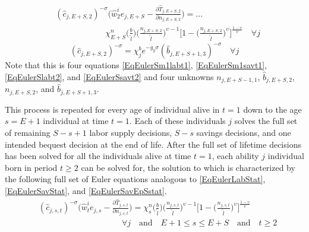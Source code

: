\documentclass[letterpaper,12pt]{article}
\theoremstyle{definition}
\begin{document}
  \begin{equation}\label{EqEulerSlabt2}
    \begin{split}
      &(\hat{c}_{j,E+S,2})^{-\sigma}\Biggl(\hat{w}_2^i e_{j,E+S} - \frac{\partial\hat{T}_{j,E+S,2}}{\partial n_{j,E+S,2}}\Biggr) = ... \\
      &\qquad\qquad\qquad \chi^n_{E+S}\biggl(\frac{b}{\tilde{l}}\biggr)\biggl(\frac{n_{j,E+S,2}}{\tilde{l}}\biggr)^{\upsilon-1}\Biggl[1 - \biggl(\frac{n_{j,E+S,2}}{\tilde{l}}\biggr)^\upsilon\Biggr]^{\frac{1-\upsilon}{\upsilon}} \quad\forall j
    \end{split}
  \end{equation}
  \begin{equation}\label{EqEulerSsavt2}
    (\hat{c}_{j,E+S,2})^{-\sigma} = \chi^b_j e^{-g_y\sigma}(\hat{b}_{j,E+S+1,3})^{-\sigma} \quad\forall j
  \end{equation}
  Note that this is four equations \eqref{EqEulerSm1labt1}, \eqref{EqEulerSm1savt1}, \eqref{EqEulerSlabt2}, and \eqref{EqEulerSsavt2} and four unknowns $n_{j,E+S-1,1}$, $\hat{b}_{j,E+S,2}$, $n_{j,E+S,2}$, and $\hat{b}_{j,E+S+1,3}$.

  This process is repeated for every age of individual alive in $t=1$ down to the age $s=E+1$ individual at time $t=1$. Each of these individuals $j$ solves the full set of remaining $S-s+1$ labor supply decisions, $S-s$ savings decisions, and one intended bequest decision at the end of life. After the full set of lifetime decisions has been solved for all the individuals alive at time $t=1$, each ability $j$ individual born in period $t\geq 2$ can be solved for, the solution to which is characterized by the following full set of Euler equations analogous to \eqref{EqEulerLabStat}, \eqref{EqEulerSavStat}, and \eqref{EqEulerSavEpSstat}.
  \begin{equation}\label{EqEulerslabt}
    \begin{split}
      &(\hat{c}_{j,s,t})^{-\sigma}\Biggl(\hat{w}_t^i e_{j,s} - \frac{\partial\hat{T}_{j,s,t}}{\partial n_{j,s,t}}\Biggr) =  \chi^n_{s}\biggl(\frac{b}{\tilde{l}}\biggr)\biggl(\frac{n_{j,s,t}}{\tilde{l}}\biggr)^{\upsilon-1}\Biggl[1 - \biggl(\frac{n_{j,s,t}}{\tilde{l}}\biggr)^\upsilon\Biggr]^{\frac{1-\upsilon}{\upsilon}} \\
      &\qquad\qquad\qquad\qquad\qquad\forall j \quad\text{and}\quad E+1\leq s\leq E+S\quad\text{and}\quad t\geq 2
    \end{split}
  \end{equation}
\end{document}

